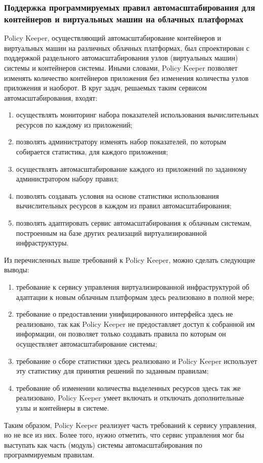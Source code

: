 \subsubsection{Поддержка программируемых правил автомасштабирования для контейнеров и виртуальных машин на облачных платформах}
Policy Keeper\cite{supporting-programmable-autoscaling}, осуществляющий автомасштабирование контейнеров и виртуальных машин на различных облачных платформах, был спроектирован с поддержкой раздельного автомасштабирования узлов (виртуальных машин) системы и контейнеров системы.
Иными словами, Policy Keeper позволяет изменять количество контейнеров приложения без изменения количества узлов приложения и наоборот.
В круг задач, решаемых таким сервисом автомасштабирования, входят:
\begin{enumerate}
    \item осуществлять мониторинг набора показателей использования вычислительных ресурсов по каждому из приложений;
    \item позволять администратору изменять набор показателей, по которым собирается статистика, для каждого приложения;
    \item осуществлять автомасштабирование каждого из приложений по заданному администратором набору правил;
    \item позволять создавать условия на основе статистики использования вычислительных ресурсов в каждом из правил автомасштабирования;
    \item позволять адаптировать сервис автомасштабирования к облачным системам, построенным на базе других реализаций виртуализированной инфраструктуры.
\end{enumerate}

Из перечисленных выше требований к Policy Keeper, можно сделать следующие выводы:
\begin{enumerate}
    \item требование к сервису управления виртуализированной инфраструктурой об адаптации к новым облачным платформам здесь реализовано в полной мере;
    \item требование о предоставлении унифицированного интерфейса здесь не реализовано, так как Policy Keeper не предоставляет доступ к собранной им информации, он позволяет только создавать правила по которым он осуществляет автомасштабирование системы;
    \item требование о сборе статистики здесь реализовано и Policy Keeper использует эту статистику для принятия решений по заданным правилам;
    \item требование об изменении количества выделенных ресурсов здесь так же реализовано, Policy Keeper умеет включать и отключать дополнительные узлы и контейнеры в системе.
\end{enumerate}

Таким образом, Policy Keeper реализует часть требований к сервису управления, но не все из них. Более того, нужно отметить, что сервис управления мог бы выступать как часть (модуль) системы автомасштабирования по программируемым правилам.

